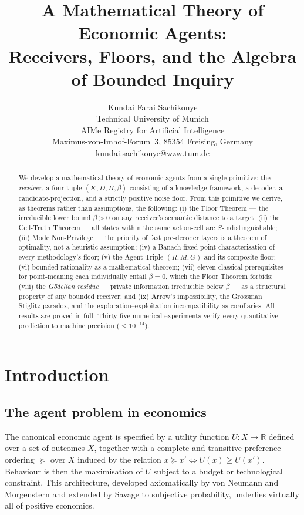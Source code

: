 \documentclass[twocolumn,11pt,a4paper]{article}
\title{\textbf{A Mathematical Theory of Economic Agents:\\
Receivers, Floors, and the Algebra of Bounded Inquiry}}
\author{%
  Kundai Farai Sachikonye\\[4pt]
  \small Technical University of Munich\\
  \small AIMe Registry for Artificial Intelligence\\
  \small Maximus-von-Imhof-Forum~3, 85354 Freising, Germany\\
  \small \href{mailto:kundai.sachikonye@wzw.tum.de}{kundai.sachikonye@wzw.tum.de}
}
\date{}
\newcommand{\R}{\mathbb{R}}
\begin{document}
\maketitle

\begin{abstract}
We develop a mathematical theory of economic agents from a single primitive: the
\emph{receiver}, a four-tuple $(K,D,\Pi,\beta)$ consisting of a knowledge
framework, a decoder, a candidate-projection, and a strictly positive noise
floor.  From this primitive we derive, as theorems rather than assumptions, the
following: (i) the Floor Theorem — the irreducible lower bound $\beta>0$ on any
receiver's semantic distance to a target; (ii) the Cell-Truth Theorem — all
states within the same action-cell are $S$-indistinguishable; (iii) Mode
Non-Privilege — the priority of fast pre-decoder layers is a theorem of
optimality, not a heuristic assumption; (iv) a Banach fixed-point characterisation
of every methodology's floor; (v) the Agent Triple $(R,M,G)$ and its composite
floor; (vi) bounded rationality as a mathematical theorem; (vii) eleven classical
prerequisites for point-meaning each individually entail $\beta=0$, which the
Floor Theorem forbids; (viii) the \emph{G\"odelian residue} — private information
irreducible below $\beta$ — as a structural property of any bounded receiver; and
(ix) Arrow's impossibility, the Grossman--Stiglitz paradox, and the
exploration--exploitation incompatibility as corollaries.  All results are proved
in full.  Thirty-five numerical experiments verify every quantitative prediction
to machine precision ($\leq 10^{-14}$).
\end{abstract}

{\small\tableofcontents}

\section{Introduction}
\label{sec:intro}

\subsection{The agent problem in economics}
\label{sec:intro:problem}

The canonical economic agent is specified by a utility function
$U\colon X\to\R$ defined over a set of outcomes $X$, together with a
complete and transitive preference ordering $\succeq$ over $X$ induced
by the relation $x\succeq x'\iff U(x)\geq U(x')$.  Behaviour is then
the maximisation of $U$ subject to a budget or technological constraint.
This architecture, developed axiomatically by von Neumann and Morgenstern
\cite{vnm1944} and extended by Savage \cite{savage1954} to subjective
probability, underlies virtually all of positive economics.
\end{document}
